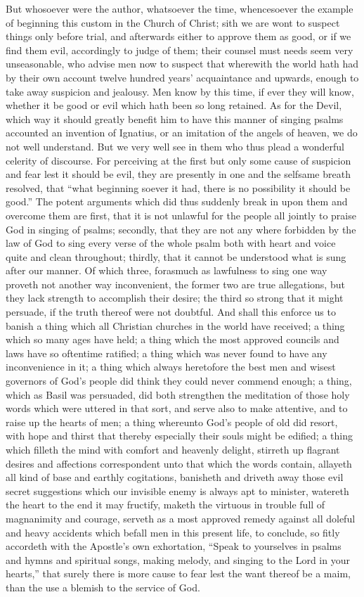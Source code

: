But whosoever were the author, whatsoever the time, whencesoever the example of beginning this custom in the Church of Christ; sith we are wont to suspect things only before trial, and afterwards either to approve them as good, or if we find them evil, accordingly to judge of them; their counsel must needs seem very unseasonable, who advise men now to suspect that wherewith the world hath had by their own account twelve hundred years’ acquaintance and upwards, enough to take away suspicion and jealousy. Men know by this time, if ever they will know, whether it be good or evil which hath been so long retained.
As for the Devil, which way it should greatly benefit him to have this manner of singing psalms accounted an invention of Ignatius, or an imitation of the angels of heaven,  we do not well understand. But we very well see in them who thus plead a wonderful celerity of discourse. For perceiving at the first but only some cause of suspicion and fear lest it should be evil, they are presently in one and the selfsame breath resolved, that “what beginning soever it had, there is no possibility it should be good.” The potent arguments which did thus suddenly break in upon them and overcome them are first, that it is not unlawful for the people all jointly to praise God in singing of psalms; secondly, that they are not any where forbidden by the law of God to sing every verse of the whole psalm both with heart and voice quite and clean throughout; thirdly, that it cannot be understood what is sung after our manner. Of which three, forasmuch as lawfulness to sing one way proveth not another way inconvenient, the former two are true allegations, but they lack strength to accomplish their desire; the third so strong that it might persuade, if the truth thereof were not doubtful.
And shall this enforce us to banish a thing which all Christian churches in the world have received; a thing which so many ages have held; a thing which the most approved councils and laws have so oftentime ratified; a thing which was never found to have any inconvenience in it; a thing which always heretofore the best men and wisest governors of God’s people did think they could never commend  enough; a thing, which as Basil was persuaded, did both strengthen the meditation of those holy words which were uttered in that sort, and serve also to make attentive, and to raise up the hearts of men; a thing whereunto God’s people of old did resort, with hope and thirst that thereby especially their souls might be edified; a thing which filleth the mind with comfort and heavenly delight, stirreth up flagrant desires and affections correspondent unto that which the words contain, allayeth all kind of base and earthly cogitations, banisheth and driveth away those evil secret suggestions which our invisible enemy is always apt to minister, watereth the heart to the end it may fructify, maketh the virtuous in trouble full of magnanimity and courage, serveth as a most approved remedy against all doleful and heavy accidents which befall men in this present life, to conclude, so fitly accordeth with the Apostle’s own exhortation, “Speak to yourselves in psalms and hymns and spiritual songs, making melody, and singing to the Lord in your hearts,” that surely there is more cause to fear lest the want thereof be a maim, than the use a blemish to the service of God.
